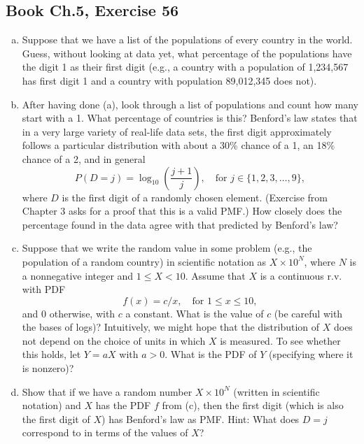 \documentclass[11pt,a4paper]{article}
\begin{document}
\vspace{10pt}
\subsection{Book Ch.5, Exercise 56}
\begin{tcolorbox}[title={Book Ch.5, Exercise 56}]
\begin{enumerate}[(a)]
\item Suppose that we have a list of the populations of every country in the world. Guess, without looking at data yet, what percentage of the populations have the digit 1 as their first digit (e.g., a country with a population of 1,234,567 has first digit 1 and a country with population 89,012,345 does not).
\item After having done (a), look through a list of populations and count how many start with a 1. What percentage of countries is this?
Benford's law states that in a very large variety of real-life data sets, the first digit approximately follows a particular distribution with about a 30\% chance of a 1, an 18\% chance of a 2, and in general
\[
P(D = j) = \log_{10}\left(\frac{j+1}{j}\right), \quad \text{for } j \in \{1, 2, 3, \dots, 9\},
\]
where $D$ is the first digit of a randomly chosen element. (Exercise from Chapter 3 asks for a proof that this is a valid PMF.) How closely does the percentage found in the data agree with that predicted by Benford's law?
\item Suppose that we write the random value in some problem (e.g., the population of a random country) in scientific notation as $X \times 10^N$, where $N$ is a nonnegative integer and $1 \le X < 10$. Assume that $X$ is a continuous r.v. with PDF
\[
f(x) = c/x, \quad \text{for } 1 \le x \le 10,
\]
and 0 otherwise, with $c$ a constant. What is the value of $c$ (be careful with the bases of logs)? Intuitively, we might hope that the distribution of $X$ does not depend on the choice of units in which $X$ is measured. To see whether this holds, let $Y = aX$ with $a > 0$. What is the PDF of $Y$ (specifying where it is nonzero)?
\item Show that if we have a random number $X \times 10^N$ (written in scientific notation) and $X$ has the PDF $f$ from (c), then the first digit (which is also the first digit of $X$) has Benford's law as PMF.
Hint: What does $D = j$ correspond to in terms of the values of $X$?
\end{enumerate}
\end{tcolorbox}
\end{document}
